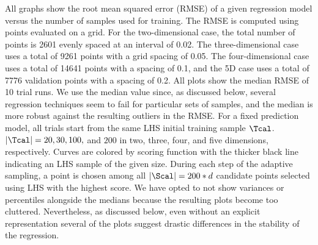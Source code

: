 All graphs show the root mean squared error (RMSE) of a given regression model versus the number of samples used for training.
%
The RMSE is computed using points evaluated on a grid.
%
For the two-dimensional case, the total number of points is 2601 evenly spaced at an interval of 0.02.
%
The three-dimensional case uses a total of 9261 points with a grid spacing of 0.05.
%
The four-dimensional case uses a total of 14641 points with a spacing of 0.1, and the 5D case uses a total of 7776 validation points with a spacing of 0.2.
%
All plots show the median RMSE of 10 trial runs.
%
We use the median value since, as discussed below, several regression techniques seem to fail for particular sets of samples, and the median is more robust against the resulting outliers in the RMSE.
%
For a fixed prediction model, all trials start from the same LHS initial training sample $\Tcal$.
%
$|\Tcal| = 20, 30, 100,$ and $200$ in two, three, four, and five dimensions, respectively.
%
Curves are colored by scoring function with the thicker black line indicating an LHS sample of the given size.
%
During each step of the adaptive sampling, a point is chosen among all $|\Scal| =
200*d$ candidate points selected using LHS with the highest score.
%
We have opted to not show variances or percentiles alongside the medians because the resulting plots become too cluttered.
%
Nevertheless, as discussed below, even without an explicit representation several of the plots suggest drastic differences in the stability of the regression.


